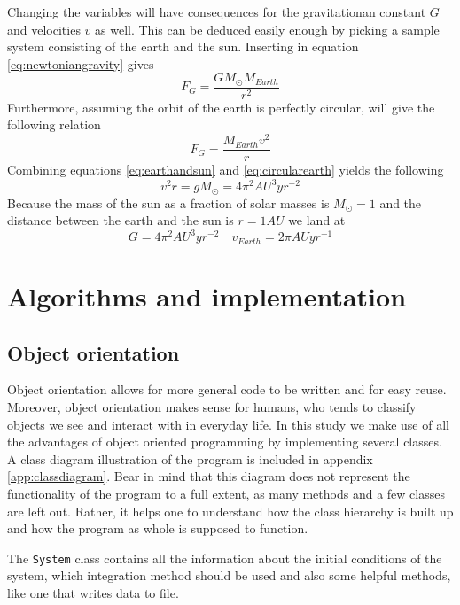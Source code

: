 \documentclass[10pt,a4paper]{amsart}
\begin{document}
Changing the variables will have consequences for the gravitationan constant $G$ and velocities $v$ as well. This can be deduced easily enough by picking a sample system consisting of the earth and the sun. Inserting in equation \ref{eq:newtoniangravity} gives
\begin{equation}
\label{eq:earthandsun}
F_G = \frac{GM_{\odot}M_{Earth}}{r^2}
\end{equation}
Furthermore, assuming the orbit of the earth is perfectly circular, will give the following relation
\begin{equation}
\label{eq:circularearth}
F_G = \frac{M_{Earth}v^2}{r}
\end{equation}
Combining equations \ref{eq:earthandsun} and \ref{eq:circularearth} yields the following
\begin{equation}
v^2r=gM_{\odot}=4\pi^2AU^3yr^{-2}
\end{equation}
Because the mass of the sun as a fraction of solar masses is $M_{\odot}=1$  and the distance between the earth and the sun is $r=1AU$ we land at
\begin{equation}
G=4\pi^2AU^3yr^{-2} \quad v_{Earth}=2\pi AUyr^{-1}
\end{equation}

\section{Algorithms and implementation}

\subsection{Object orientation}
Object orientation allows for more general code to be written and for easy reuse. Moreover, object orientation makes sense for humans, who tends to classify objects we see and interact with in everyday life. In this study we make use of all the advantages of object oriented programming by implementing several classes. A class diagram illustration of the program is included in appendix \ref{app:classdiagram}. Bear in mind that this diagram does not represent the functionality of the program to a full extent, as many methods and a few classes are left out. Rather, it helps one to understand how the class hierarchy is built up and how the program as whole is supposed to function.

The \lstinline|System| class contains all the information about the initial conditions of the system, which integration method should be used and also some helpful methods, like one that writes data to file.
\end{document}
